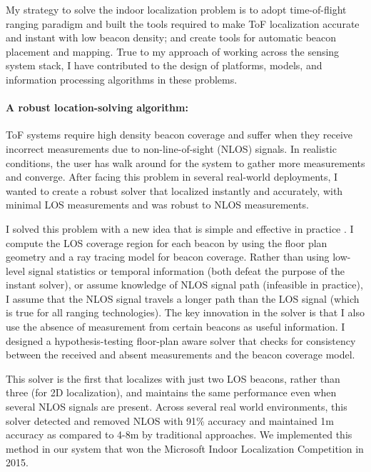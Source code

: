 \documentclass[10pt]{article}
\begin{document}
My strategy to solve the indoor localization problem is to adopt time-of-flight ranging paradigm and built the tools required to make ToF localization accurate and instant with low beacon density; and create tools for automatic beacon placement and mapping. True to my approach of working across the sensing system stack, I have contributed to the design of platforms, models, and information processing algorithms in these problems.

\paragraph{A robust location-solving algorithm: }
ToF systems require high density beacon coverage and suffer when they receive incorrect measurements due to
non-line-of-sight (NLOS) signals. 
In realistic conditions, the user has walk around for the system to gather more measurements and converge. After facing this problem in several real-world deployments, I wanted to create a robust solver that localized instantly and accurately, with minimal LOS measurements and was robust to NLOS measurements. 

I solved this problem with a new idea that is simple and effective in practice \cite{rajagopal2018enhancing}. 
I compute the LOS coverage region for each beacon by using the floor plan geometry and a ray tracing model for beacon coverage. Rather than using low-level signal statistics or temporal information (both defeat the purpose of the instant solver), or assume knowledge of NLOS signal path (infeasible in practice), I assume that the NLOS signal travels a longer path than the LOS signal (which is true for all ranging technologies). The key innovation in the solver is that I also use the absence of measurement from certain beacons as useful information. I designed a hypothesis-testing floor-plan aware solver that checks for consistency between the received and absent measurements and the beacon coverage model.

This solver is the first that localizes with just two LOS beacons, rather than three (for 2D localization), and maintains the same performance even when several NLOS signals are present. Across several real
world environments, this solver detected and removed NLOS with 91\% accuracy and maintained 1m accuracy as compared to 4-8m by traditional approaches. We implemented this
method in our system that won the Microsoft Indoor
Localization Competition in 2015. 
\end{document}
